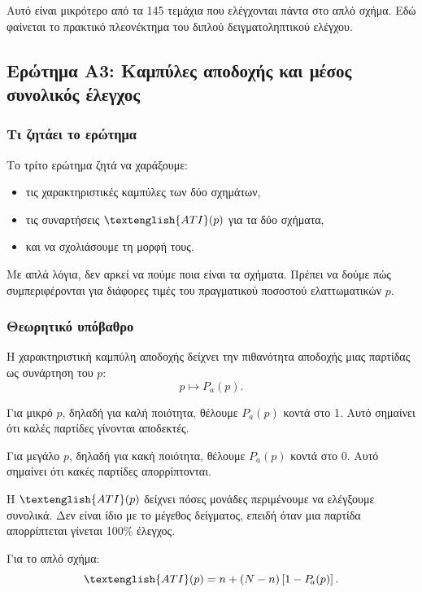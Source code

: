 \documentclass[12pt,a4paper]{article}
\newcommand{\Pa}{P_{\!a}}
\newcommand{\ATI}{\textenglish{ATI}}
\begin{document}
Αυτό είναι μικρότερο από τα 145 τεμάχια που ελέγχονται πάντα στο απλό σχήμα.
Εδώ φαίνεται το πρακτικό πλεονέκτημα του διπλού δειγματοληπτικού ελέγχου.

\subsection{Ερώτημα Α3: Καμπύλες αποδοχής και μέσος συνολικός έλεγχος}

\subsubsection*{Τι ζητάει το ερώτημα}

Το τρίτο ερώτημα ζητά να χαράξουμε:

\begin{itemize}
    \item τις χαρακτηριστικές καμπύλες των δύο σχημάτων,
    \item τις συναρτήσεις \(\ATI(p)\) για τα δύο σχήματα,
    \item και να σχολιάσουμε τη μορφή τους.
\end{itemize}

Με απλά λόγια, δεν αρκεί να πούμε ποια είναι τα σχήματα. Πρέπει να δούμε πώς
συμπεριφέρονται για διάφορες τιμές του πραγματικού ποσοστού ελαττωματικών
\(p\).

\subsubsection*{Θεωρητικό υπόβαθρο}

Η χαρακτηριστική καμπύλη αποδοχής δείχνει την πιθανότητα αποδοχής μιας παρτίδας
ως συνάρτηση του \(p\):
\[
    p \longmapsto \Pa(p).
\]

Για μικρό \(p\), δηλαδή για καλή ποιότητα, θέλουμε \(\Pa(p)\) κοντά στο 1.
Αυτό σημαίνει ότι καλές παρτίδες γίνονται αποδεκτές.

Για μεγάλο \(p\), δηλαδή για κακή ποιότητα, θέλουμε \(\Pa(p)\) κοντά στο 0.
Αυτό σημαίνει ότι κακές παρτίδες απορρίπτονται.

Η \(\ATI(p)\) δείχνει πόσες μονάδες περιμένουμε να ελέγξουμε συνολικά. Δεν
είναι ίδιο με το μέγεθος δείγματος, επειδή όταν μια παρτίδα απορρίπτεται γίνεται
100\% έλεγχος.

Για το απλό σχήμα:
\[
    \ATI(p)=n+(N-n)\left[1-\Pa(p)\right].
\]
\end{document}
